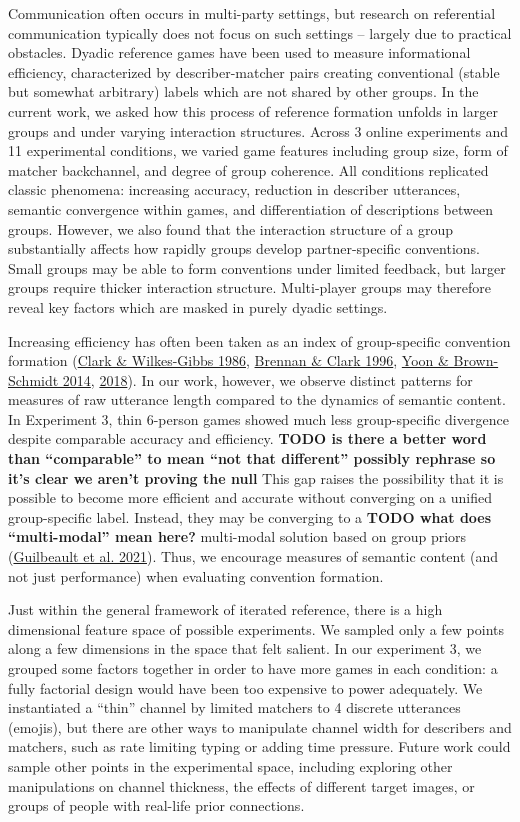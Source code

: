 \documentclass[
  english,
]{article}
\begin{document}
Communication often occurs in multi-party settings, but research on referential communication typically does not focus on such settings -- largely due to practical obstacles.
Dyadic reference games have been used to measure informational efficiency, characterized by describer-matcher pairs creating conventional (stable but somewhat arbitrary) labels which are not shared by other groups.
In the current work, we asked how this process of reference formation unfolds in larger groups and under varying interaction structures.
Across 3 online experiments and 11 experimental conditions, we varied game features including group size, form of matcher backchannel, and degree of group coherence.
All conditions replicated classic phenomena: increasing accuracy, reduction in describer utterances, semantic convergence within games, and differentiation of descriptions between groups.
However, we also found that the interaction structure of a group substantially affects how rapidly groups develop partner-specific conventions.
Small groups may be able to form conventions under limited feedback, but larger groups require thicker interaction structure.
Multi-player groups may therefore reveal key factors which are masked in purely dyadic settings.

Increasing efficiency has often been taken as an index of group-specific convention formation (\protect\hyperlink{ref-clark1986}{Clark \& Wilkes-Gibbs 1986}, \protect\hyperlink{ref-brennan1996}{Brennan \& Clark 1996}, \protect\hyperlink{ref-yoon2014}{Yoon \& Brown-Schmidt 2014}, \protect\hyperlink{ref-yoon2018}{2018}).
In our work, however, we observe distinct patterns for measures of raw utterance length compared to the dynamics of semantic content.
In Experiment 3, thin 6-person games showed much less group-specific divergence despite comparable accuracy and efficiency. \textbf{TODO is there a better word than ``comparable'' to mean ``not that different'' possibly rephrase so it's clear we aren't proving the null}
This gap raises the possibility that it is possible to become more efficient and accurate without converging on a unified group-specific label.
Instead, they may be converging to a \textbf{TODO what does ``multi-modal'' mean here?} multi-modal solution based on group priors (\protect\hyperlink{ref-guilbeault2021}{Guilbeault et al. 2021}).
Thus, we encourage measures of semantic content (and not just performance) when evaluating convention formation.

Just within the general framework of iterated reference, there is a high dimensional feature space of possible experiments. We sampled only a few points along a few dimensions in the space that felt salient. In our experiment 3, we grouped some factors together in order to have more games in each condition: a fully factorial design would have been too expensive to power adequately. We instantiated a ``thin'' channel by limited matchers to 4 discrete utterances (emojis), but there are other ways to manipulate channel width for describers and matchers, such as rate limiting typing or adding time pressure. Future work could sample other points in the experimental space, including exploring other manipulations on channel thickness, the effects of different target images, or groups of people with real-life prior connections.
\end{document}
